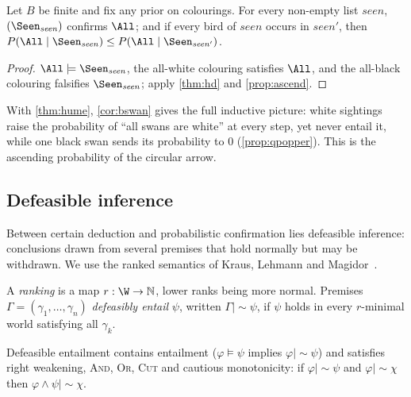 \begin{corollary}\label{cor:bswan}
Let $B$ be finite and fix any prior on colourings. For every non-empty list $\mathit{seen}$,
$(\Seen_{\mathit{seen}})$ confirms $\All$; and if every bird of $\mathit{seen}$ occurs in
$\mathit{seen}'$, then $P(\All\mid\Seen_{\mathit{seen}})\le P(\All\mid\Seen_{\mathit{seen}'})$.
\end{corollary}

\begin{proof}
$\All\models\Seen_{\mathit{seen}}$, the all-white colouring satisfies $\All$, and the all-black
colouring falsifies $\Seen_{\mathit{seen}}$; apply \cref{thm:hd} and \cref{prop:ascend}.
\end{proof}

With \cref{thm:hume}, \cref{cor:bswan} gives the full inductive picture: white sightings raise the
probability of ``all swans are white'' at every step, yet never entail it, while one black swan
sends its probability to $0$ (\cref{prop:qpopper}). This is the ascending probability of the
circular arrow.

\subsection{Defeasible inference}\label{sec:defeasible}

Between certain deduction and probabilistic confirmation lies defeasible inference: conclusions
drawn from several premises that hold normally but may be withdrawn. We use the ranked semantics
of Kraus, Lehmann and Magidor~\cite{klm}.

\begin{definition}\label{def:normally}
A \emph{ranking} is a map $r:\W\to\mathbb N$, lower ranks being more normal. Premises
$\Gamma=(\gamma_1,\dots,\gamma_n)$ \emph{defeasibly entail} $\psi$, written $\Gamma\mathrel{|\!\sim}\psi$,
if $\psi$ holds in every $r$-minimal world satisfying all $\gamma_k$.
\end{definition}

\begin{theorem}\label{thm:klm}
Defeasible entailment contains entailment ($\varphi\models\psi$ implies
$\varphi\mathrel{|\!\sim}\psi$) and satisfies right weakening, \textup{\textsc{And}}, \textup{\textsc{Or}},
\textup{\textsc{Cut}} and cautious monotonicity: if $\varphi\mathrel{|\!\sim}\psi$ and
$\varphi\mathrel{|\!\sim}\chi$ then $\varphi\wedge\psi\mathrel{|\!\sim}\chi$.
\end{theorem}

